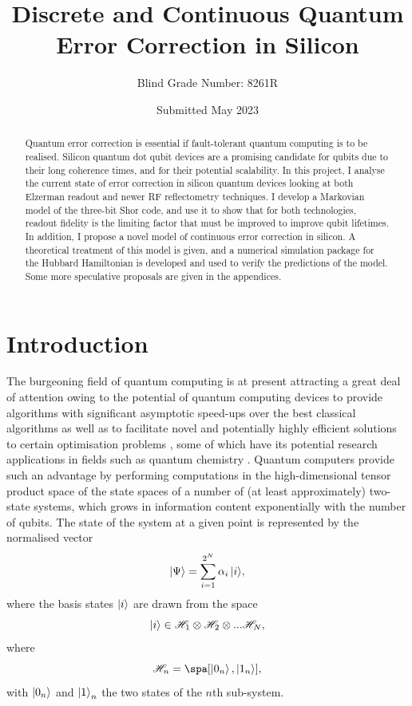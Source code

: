 \documentclass{report}
\title{Discrete and Continuous Quantum Error Correction in Silicon}
\author{Blind Grade Number: 8261R}
\date{Submitted May 2023}
\begin{document}
\maketitle

\begin{abstract}
    Quantum error correction is essential if fault-tolerant quantum computing is to be realised. Silicon quantum dot qubit devices are a promising candidate for qubits due to their long coherence times, and for their potential scalability. In this project, I analyse the current state of error correction in silicon quantum devices looking at both Elzerman readout and newer RF reflectometry techniques. I develop a Markovian model of the three-bit Shor code, and use it to show that for both technologies, readout fidelity is the limiting factor that must be improved to improve qubit lifetimes. In addition, I propose a novel model of continuous error correction in silicon. A theoretical treatment of this model is given, and a numerical simulation package for the Hubbard Hamiltonian is developed and used to verify the predictions of the model. Some more speculative proposals are given in the appendices.
\end{abstract}

\tableofcontents

\chapter{Introduction}
The burgeoning field of quantum computing is at present attracting a great deal of attention owing to the potential of quantum computing devices to provide algorithms with significant asymptotic speed-ups over the best classical algorithms \cite{shor_1997} as well as to facilitate novel and potentially highly efficient solutions to certain optimisation problems \cite{tilly_2022}, some of which have its potential research applications in fields such as quantum chemistry \cite{cao_2019}. Quantum computers provide such an advantage by performing computations in the high-dimensional tensor product space of the state spaces of a number of (at least approximately) two-state systems, which grows in information content exponentially with the number of qubits. The state of the system at a given point is represented by the normalised vector 
\begin{equation*}
    \ket{\Psi} = \sum_{i = 1}^{2^N}{\alpha_i \ket{i}},
\end{equation*}
where the basis states $\ket{i}$ are drawn from the space
\begin{equation*}
    \ket{i} \in \mathscr{H}_1 \otimes \mathscr{H}_2 \otimes ... \mathscr{H}_N,
\end{equation*}
where
\begin{equation*}
    \mathscr{H}_n = \spa[\ket{0_n},\ket{1_n}],
\end{equation*} with $\ket{0_n}$ and $\ket{1}_n$ the two states of the $n$th sub-system.
\end{document}
